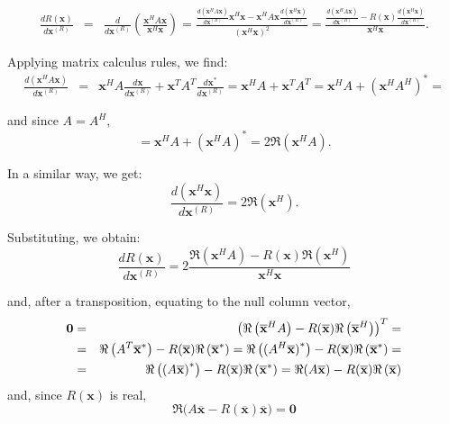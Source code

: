 \documentclass[12pt]{article}
\begin{document}
\begin{eqnarray*}
\frac{dR(\mathbf{x})}{d\mathbf{x}^{(R)}} &=&\frac{d}{d\mathbf{x}^{(R)}}
\left( \frac{\mathbf{x}^{H}A\mathbf{x}}{\mathbf{x}^{H}\mathbf{x}}\right) =
\frac{\frac{d\left( \mathbf{x}^{H}A\mathbf{x}\right) }{d\mathbf{x}^{(R)}}
\mathbf{x}^{H}\mathbf{x-x}^{H}A\mathbf{x}\frac{d\left( \mathbf{x}^{H}\mathbf{
x}\right) }{d\mathbf{x}^{(R)}}}{\left( \mathbf{x}^{H}\mathbf{x}\right) ^{2}}=\frac{\frac{d\left( \mathbf{x}^{H}A\mathbf{x}\right) }{d\mathbf{x}^{(R)}}
-R(\mathbf{x})\frac{d\left( \mathbf{x}^{H}\mathbf{x}\right) }{d\mathbf{x}
^{(R)}}}{\mathbf{x}^{H}\mathbf{x}}\text{.}
\end{eqnarray*}

Applying matrix calculus rules, we find:
\begin{eqnarray*}
\frac{d\left( \mathbf{x}^{H}A\mathbf{x}\right) }{d\mathbf{x}^{(R)}} &=&%
\mathbf{x}^{H}A\frac{d\mathbf{x}}{d\mathbf{x}^{(R)}}+\mathbf{x}^{T}A^{T}%
\frac{d\mathbf{x}^{\ast }}{d\mathbf{x}^{(R)}}=\mathbf{x}^{H}A+\mathbf{x}^{T}A^{T}=\mathbf{x}^{H}A+\left( \mathbf{x}%
^{H}A^{H}\right) ^{\ast }=
\end{eqnarray*}

and since $A=A^{H}$,%
\begin{equation*}
=\mathbf{x}^{H}A+\left( \mathbf{x}^{H}A\right) ^{\ast }=2\Re\left( 
\mathbf{x}^{H}A\right) \text{.}
\end{equation*}

In a similar way, we get:%
\begin{equation*}
\frac{d\left( \mathbf{x}^{H}\mathbf{x}\right) }{d\mathbf{x}^{(R)}}=2\Re%
\left( \mathbf{x}^{H}\right) \text{.}
\end{equation*}

Substituting, we obtain:%
\begin{equation*}
\frac{dR(\mathbf{x})}{d\mathbf{x}^{(R)}}=2\frac{\Re\left( \mathbf{x}^{H}A\right) -R(\mathbf{x})\Re\left( \mathbf{x}^{H}\right) }{\mathbf{x}^{H}\mathbf{x}}
\end{equation*}

and, after a transposition, equating to the null column vector,%
\begin{eqnarray*}
\mathbf{0} &=&\left( \Re\left( \overline{\mathbf{x}}^{H}A\right) -R(%
\overline{\mathbf{x}})\Re\left( \overline{\mathbf{x}}^{H}\right)
\right) ^{T}= \\
&=&\Re\left( A^{T}\overline{\mathbf{x}}^{\ast }\right) -R(\overline{%
\mathbf{x}})\Re\left( \overline{\mathbf{x}}^{\ast }\right) =\Re%
\left( (A^{H}\overline{\mathbf{x}}\mathbf{)}^{\ast }\right) -R(\overline{%
\mathbf{x}})\Re\left( \overline{\mathbf{x}}^{\ast }\right) = \\
&=&\Re\left( (A\overline{\mathbf{x}}\mathbf{)}^{\ast }\right) -R(%
\overline{\mathbf{x}})\Re\left( \overline{\mathbf{x}}^{\ast }\right) =%
\Re(A\overline{\mathbf{x}}\mathbf{)}-R(\overline{\mathbf{x}})\Re%
\left( \overline{\mathbf{x}}\right)
\end{eqnarray*}%
\newline
and, since $R(\mathbf{x})$ is real,%
\begin{equation*}
\Re(A\overline{\mathbf{x}}-R(\overline{\mathbf{x}})\overline{\mathbf{x}}\mathbf{)=0}
\end{equation*}
\end{document}
